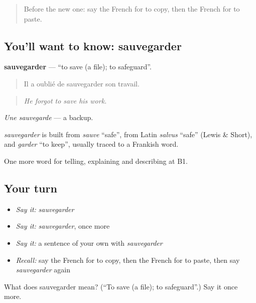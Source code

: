 \label{lesson:FR-C397-sauvegarder}



\begin{quote}
Before the new one: say the French for to copy, then the French for to paste.
\end{quote}

\subsection*{You'll want to know: sauvegarder}
\textbf{sauvegarder} — \textquotedblleft{}to save (a file); to safeguard\textquotedblright{}.

\begin{quote}
Il a oublié de sauvegarder son travail.
\end{quote}

\begin{quote}
\emph{He forgot to save his work.}
\end{quote}

\emph{Une sauvegarde} — a backup.

\begin{cousinweb}
\emph{sauvegarder} is built from \emph{sauve} \textquotedblleft{}safe\textquotedblright{}, from Latin \emph{salvus} \textquotedblleft{}safe\textquotedblright{} (Lewis \& Short), and \emph{garder} \textquotedblleft{}to keep\textquotedblright{}, usually traced to a Frankish word.
\end{cousinweb}

\begin{grammarlens}[title={What you've built}]
One more word for telling, explaining and describing at B1.
\end{grammarlens}

\subsection*{Your turn}
\begin{itemize}
\raggedright
  \item \emph{Say it:} \emph{sauvegarder}
  \item \emph{Say it:} \emph{sauvegarder}, once more
  \item \emph{Say it:} a sentence of your own with \emph{sauvegarder}
  \item \emph{Recall:} say the French for to copy, then the French for to paste, then say \emph{sauvegarder} again
\end{itemize}

\begin{tcolorbox}[breakable,colback=teal!4,colframe=teal!35!black,title={Before you move on}]
What does sauvegarder mean? (\textquotedblleft{}To save (a file); to safeguard\textquotedblright{}.) Say it once more.
\end{tcolorbox}
